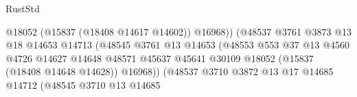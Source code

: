 \begin{lexlean}{RustStd}
\begin{coremodule}
{\begin{coremodule}
{{{{{{{{{{{{{{{{{{{{{{{{{{{{{{{{{{{{{{{{{{{{{{{{{{{{{{{{{{{{                                                          @18052
                                                          (@15837 (@18408 @14617 @14602))
                                                          @16968))
                                                      (@48537
                                                        @3761
                                                        @3873
                                                        @13
                                                        @18
                                                        @14653
                                                        @14713
                                                        (@48545
                                                          @3761
                                                          @13
                                                          @14653
                                                          (@48553
                                                            @553
                                                            @37
                                                            @13
                                                            @4560
                                                            @4726
                                                            @14627
                                                            @14648
                                                            @48571
                                                            @45637
                                                            @45641
                                                            @30109
                                                            @18052
                                                            (@15837 (@18408 @14648 @14628))
                                                            @16968))
                                                        (@48537
                                                          @3710
                                                          @3872
                                                          @13
                                                          @17
                                                          @14685
                                                          @14712
                                                          (@48545
                                                            @3710
                                                            @13
                                                            @14685
}}}}}}}}}}}}}}}}}}}}}}}}}}}}}}}}}}}}}}}}}}}}}}}}}}}}}}}}}}}}
\end{coremodule}}
\end{coremodule}
\end{lexlean}
